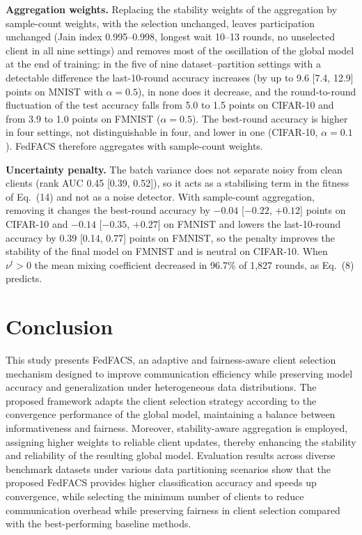 \documentclass[pdflatex,sn-mathphys-num,oneside]{sn-jnl}%
\theoremstyle{thmstyleone}%
\theoremstyle{thmstyletwo}%
\theoremstyle{thmstylethree}%
\begin{document}
\textbf{Aggregation weights.} Replacing the stability weights of the aggregation by sample-count weights, with the selection unchanged, leaves participation unchanged (Jain index 0.995--0.998, longest wait 10--13 rounds, no unselected client in all nine settings) and removes most of the oscillation of the global model at the end of training: in the five of nine dataset--partition settings with a detectable difference the last-10-round accuracy increases (by up to 9.6 [7.4, 12.9] points on MNIST with $\alpha=0.5$), in none does it decrease, and the round-to-round fluctuation of the test accuracy falls from 5.0 to 1.5 points on CIFAR-10 and from 3.9 to 1.0 points on FMNIST ($\alpha=0.5$). The best-round accuracy is higher in four settings, not distinguishable in four, and lower in one (CIFAR-10, $\alpha=0.1$). FedFACS therefore aggregates with sample-count weights.

\textbf{Uncertainty penalty.} The batch variance does not separate noisy from clean clients (rank AUC 0.45 [0.39, 0.52]), so it acts as a stabilising term in the fitness of Eq.~(14) and not as a noise detector. With sample-count aggregation, removing it changes the best-round accuracy by $-0.04$ [$-0.22$, $+0.12$] points on CIFAR-10 and $-0.14$ [$-0.35$, $+0.27$] on FMNIST and lowers the last-10-round accuracy by 0.39 [0.14, 0.77] points on FMNIST, so the penalty improves the stability of the final model on FMNIST and is neutral on CIFAR-10. When $\nu^t>0$ the mean mixing coefficient decreased in 96.7\% of 1,827 rounds, as Eq.~(8) predicts.

\section{Conclusion}
\label{sec:conclusion}

This study presents FedFACS, an adaptive and fairness-aware client selection mechanism designed to improve communication efficiency while preserving model accuracy and generalization under heterogeneous data distributions. The proposed framework adapts the client selection strategy according to the convergence performance of the global model, maintaining a balance between informativeness and fairness. Moreover, stability-aware aggregation is employed, assigning higher weights to reliable client updates, thereby enhancing the stability and reliability of the resulting global model. Evaluation results across diverse benchmark datasets under various data partitioning scenarios show that the proposed FedFACS provides higher classification accuracy and speeds up convergence, while selecting the minimum number of clients to reduce communication overhead while preserving fairness in client selection compared with the best-performing baseline methods.
\end{document}
